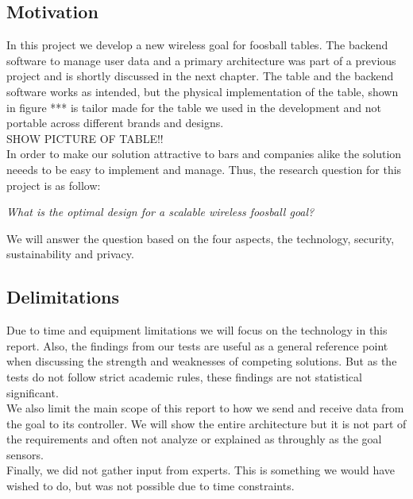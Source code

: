 \subsection{Motivation}
In this project we develop a new wireless goal for foosball tables. The backend software to manage user data and a primary architecture was part of a previous project and is shortly discussed in the next chapter. The table and the backend software works as intended, but the physical implementation of the table, shown in figure *** is tailor made for the table we used in the development and not portable across different brands and designs. 
\\
SHOW PICTURE OF TABLE!!\\

In order to make our solution attractive to bars and companies alike the solution neeeds to be easy to implement and manage. Thus, the research question for this project is as follow:
\begin{center}
    \textit{What is the optimal design for a scalable wireless foosball goal?}
\end{center}
We will answer the question based on the four aspects, the technology, security, sustainability and privacy. 

\subsection{Delimitations}
Due to time and equipment limitations we will focus on the technology in this report. Also, the findings from our tests are useful as a general reference point when discussing the strength and weaknesses of competing solutions. But as the tests do not follow strict academic rules, these findings are not statistical significant. \\
We also limit the main scope of this report to how we send and receive data from the goal to its controller. We will show the entire architecture but it is not part of the requirements and often not analyze or explained as throughly as the goal sensors.\\
Finally, we did not gather input from experts. This is something we would have wished to do, but was not possible due to time constraints.